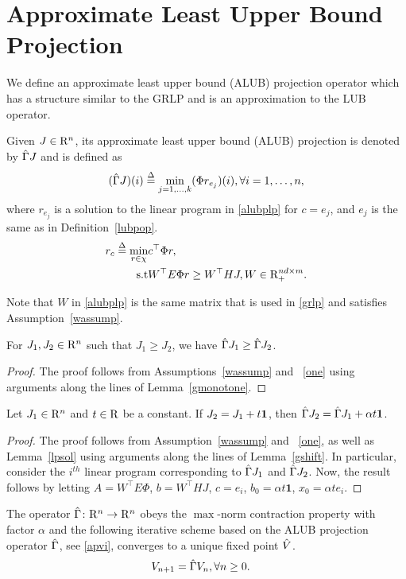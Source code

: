 \documentclass[12pt,draftcls,onecolumn]{IEEEtran}
\begin{document}
\section{Approximate Least Upper Bound Projection}\label{sec:alubp}
We define an approximate least upper bound (ALUB) projection operator which has a structure similar to the GRLP and is an approximation to the LUB operator.
\begin{definition}\label{alubpop}
Given $J\in \mathrm{R}^n$, its approximate least upper bound (ALUB) projection is denoted by $\hat{\Gamma} J$ and is defined as 
\begin{align}\label{tgamdef}
(\hg J)(i)\stackrel{\Delta}{=}\underset{j=1,\ldots,k}{\min} (\Phi r_{e_j})(i), \mb \forall i=1,\ldots,n,
\end{align}
where $r_{e_j}$ is a solution to the linear program in \eqref{alubplp} for $c=e_j$, and $e_j$ is the same as in Definition~\ref{lubpop}.
\begin{align}\label{alubplp}
r_c\stackrel{\Delta}{=}\min_{r\in \chi} &c^\top \Phi r,\nn\\
\text{s.t}\mb &W^\top E \Phi r\geq W^\top HJ, W \in \R^{nd\times m}_+ .
\end{align}
\end{definition}
Note that $W$ in \eqref{alubplp} is the same matrix that is used in \eqref{grlp} and satisfies Assumption~\ref{wassump}.
\begin{lemma}\label{tgmonotone}
For $J_1, J_2\in \mathrm{R}^n$ such that $J_1\geq J_2$, we have $\hat{\Gamma} J_1\geq \hat{\Gamma} J_2$.
\end{lemma}
\begin{proof}
The proof follows from Assumptions~\ref{wassump} and ~\ref{one} using arguments along the lines of Lemma~\ref{gmonotone}.
\end{proof}
\begin{lemma}\label{tgshift}
Let $J_1\in \mathrm{R}^n$ and $t\in \mathrm{R}$ be a constant. If $J_2=J_1+t\mathbf{1}$, then $\hat{\Gamma} J_2=\hat{\Gamma} J_1+\alpha t\mathbf{1}$.
\end{lemma}
\begin{proof}
The proof follows from Assumption~\ref{wassump} and ~\ref{one}, as well as Lemma~\ref{lpsol} using arguments along the lines of Lemma~\ref{gshift}. In particular, consider the $i^{th}$ linear program corresponding to $\hat{\Gamma} J_1$ and $\hat{\Gamma} J_2$. Now, the result follows by letting $A=W^\top E \Phi$, $b=W^\top H J$, $c=e_i$, $b_0=\alpha t \mathbf{1}$, $x_0=\alpha t e_i$.
\end{proof}
\begin{theorem}\label{tgmaxcontra}
The operator $\hat{\Gamma} \colon \mathrm{R}^n\rightarrow \mathrm{R}^n$ obeys the $\max$-norm contraction property with factor $\alpha$ and the following iterative scheme based on the ALUB projection operator $\hat{\Gamma}$, see \eqref{apvi}, converges to a unique fixed point $\hat{V}$.
\begin{align}\label{apvi}
V_{n+1}&=\hg V_n,\mb\forall n\geq 0.
\end{align}
\end{theorem}
\end{document}
